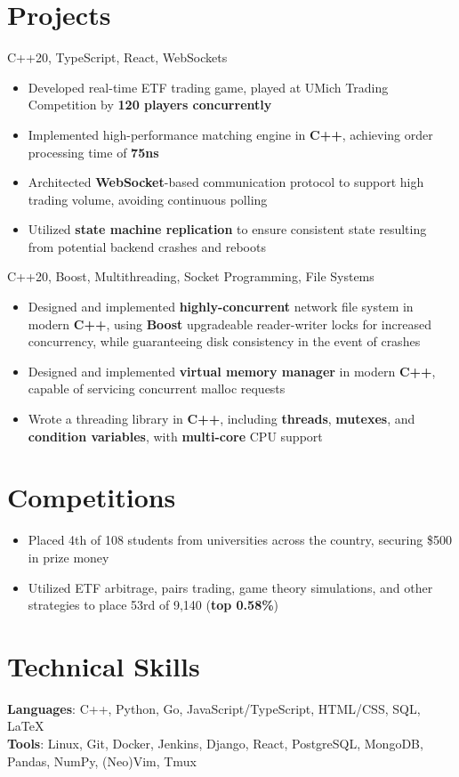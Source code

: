 \documentclass[letterpaper,11pt]{article}
\begin{document}
\section{Projects}
{C++20, TypeScript, React, WebSockets}{}
\begin{itemize}
  \item Developed real-time ETF trading game, played at UMich Trading Competition
        by \textbf{120 players concurrently}
  \item Implemented high-performance matching engine in \textbf{C++}, achieving
        order processing time of \textbf{75ns}
  \item Architected \textbf{WebSocket}-based communication protocol to support high
        trading volume, avoiding continuous polling
  \item Utilized \textbf{state machine replication} to ensure consistent state
        resulting from potential backend crashes and reboots
\end{itemize}
{C++20, Boost, Multithreading, Socket Programming, File Systems}{}
\begin{itemize}
  \item Designed and implemented \textbf{highly-concurrent} network file system in modern
        \textbf{C++}, using \textbf{Boost} upgradeable reader-writer locks for
        increased concurrency, while guaranteeing disk consistency in the event
        of crashes
\end{itemize}
\begin{itemize}
  \item Designed and implemented \textbf{virtual memory manager} in modern
        \textbf{C++}, capable of servicing concurrent malloc requests
  \item Wrote a threading library in \textbf{C++}, including \textbf{threads}, \textbf{mutexes},
        and \textbf{condition variables}, with \textbf{multi-core} CPU support
\end{itemize}
\section{Competitions}
\begin{itemize}
  \item Placed 4th of 108 students from universities across the country, securing \$500 in prize money
\end{itemize}
\begin{itemize}
  \item Utilized ETF arbitrage, pairs trading, game theory simulations, and
        other strategies to place 53rd of 9,140 (\textbf{top 0.58\%})
\end{itemize}
\section{Technical Skills}
\textbf{Languages}: C++, Python, Go, JavaScript/TypeScript, HTML/CSS, SQL,
\LaTeX \\
\textbf{Tools}: Linux, Git, Docker, Jenkins, Django, React,
PostgreSQL, MongoDB, Pandas, NumPy, (Neo)Vim, Tmux
\end{document}
